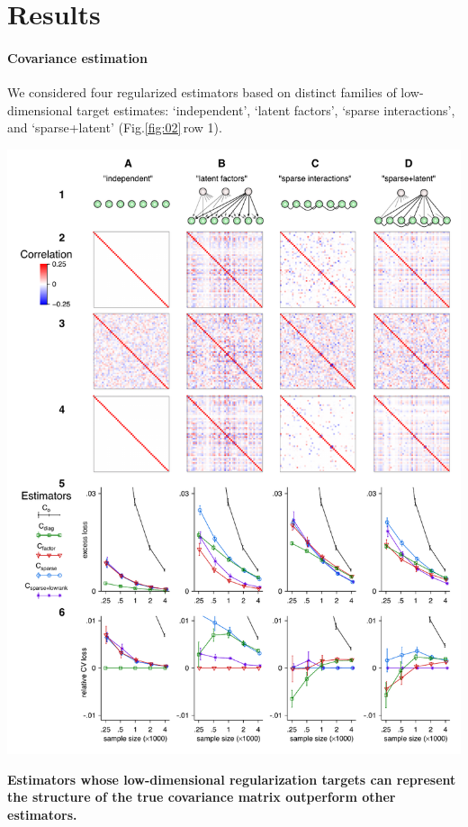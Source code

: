 \documentclass[10pt]{article}
\newcommand{\figref}[2]{Fig.\;\ref{fig:#1}\,#2}
\begin{document}
\section*{Results}

\paragraph{Covariance estimation}
We considered four regularized estimators based on distinct families of low-dimensional target estimates: `independent', `latent factors', `sparse interactions', and `sparse+latent' (\figref{02}{row 1}).  

\begin{FPfigure}
    \begin{center}
        \includegraphics{./figures/Figure02.pdf}
    \end{center}
    \caption{{\bf Estimators whose low-dimensional regularization targets can represent the structure of the true covariance matrix outperform other estimators.}
}
\end{FPfigure}
\end{document}
